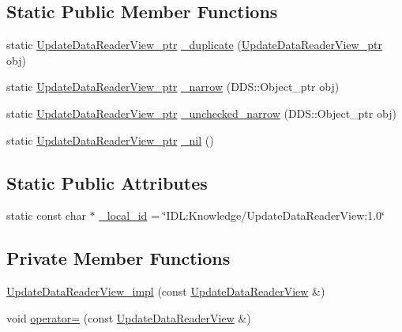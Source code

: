 \subsection*{Static Public Member Functions}
\begin{DoxyCompactItemize}
\item 
static \hyperlink{classKnowledge_1_1UpdateDataReaderView}{UpdateDataReaderView\_\-ptr} \hyperlink{classKnowledge_1_1UpdateDataReaderView_a6f26fa05470b2a66383cbb6e370a3ce1}{\_\-duplicate} (\hyperlink{classKnowledge_1_1UpdateDataReaderView}{UpdateDataReaderView\_\-ptr} obj)
\item 
static \hyperlink{classKnowledge_1_1UpdateDataReaderView}{UpdateDataReaderView\_\-ptr} \hyperlink{classKnowledge_1_1UpdateDataReaderView_a688f499c752d862cf3e3f4d62ea805cf}{\_\-narrow} (DDS::Object\_\-ptr obj)
\item 
static \hyperlink{classKnowledge_1_1UpdateDataReaderView}{UpdateDataReaderView\_\-ptr} \hyperlink{classKnowledge_1_1UpdateDataReaderView_af375e21f40dfc412c8d718cafc2b8d50}{\_\-unchecked\_\-narrow} (DDS::Object\_\-ptr obj)
\item 
static \hyperlink{classKnowledge_1_1UpdateDataReaderView}{UpdateDataReaderView\_\-ptr} \hyperlink{classKnowledge_1_1UpdateDataReaderView_aa423125ab5a10c81941866dae69efadc}{\_\-nil} ()
\end{DoxyCompactItemize}
\subsection*{Static Public Attributes}
\begin{DoxyCompactItemize}
\item 
static const char $\ast$ \hyperlink{classKnowledge_1_1UpdateDataReaderView_a245b395880e8012c3522f482ce57714d}{\_\-local\_\-id} = \char`\"{}IDL:Knowledge/UpdateDataReaderView:1.0\char`\"{}
\end{DoxyCompactItemize}
\subsection*{Private Member Functions}
\begin{DoxyCompactItemize}
\item 
\hyperlink{classKnowledge_1_1UpdateDataReaderView__impl_acb37ce1f79802df2cb6ca851d42db0e3}{UpdateDataReaderView\_\-impl} (const \hyperlink{classKnowledge_1_1UpdateDataReaderView}{UpdateDataReaderView} \&)
\item 
void \hyperlink{classKnowledge_1_1UpdateDataReaderView__impl_a90d696b564b744dd23ec9136677c0163}{operator=} (const \hyperlink{classKnowledge_1_1UpdateDataReaderView}{UpdateDataReaderView} \&)
\end{DoxyCompactItemize}


